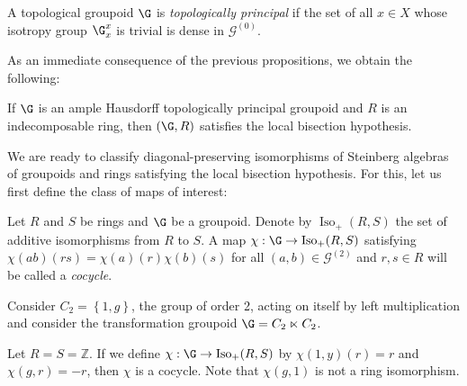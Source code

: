 \begin{definition}\label{definitiontopologicallyprincipal}
A topological groupoid $\G$ is \emph{topologically principal} if the set of all $x\in X$ whose isotropy group $\G_x^x$ is trivial is dense in $\mathcal{G}^{(0)}$.
\end{definition}

As an immediate consequence of the previous propositions, we obtain the following:

\begin{corollary}\label{corollarytopologicallyprincipalsatisfieslocalbisectionhypothesis}
If $\G$ is an ample Hausdorff topologically principal groupoid and $R$ is an indecomposable ring, then $(\G,R)$ satisfies the local bisection hypothesis.
\end{corollary}

We are ready to classify diagonal-preserving isomorphisms of Steinberg algebras of groupoids and rings satisfying the local bisection hypothesis. For this, let us first define the class of maps of interest:

\begin{definition}\label{definitioncocycle}
Let $R$ and $S$ be rings and $\G$ be a groupoid. Denote by $\operatorname{Iso}_+(R,S)$ the set of additive isomorphisms from $R$ to $S$. A map $\chi:\G\to\operatorname{Iso}_+(R,S)$ satisfying $\chi(ab)(rs)=\chi(a)(r)\chi(b)(s)$ for all $(a,b)\in\mathcal{G}^{(2)}$ and $r,s\in R$ will be called a \emph{cocycle}.
\end{definition}


\begin{example}
Consider $C_2=\left\{1,g\right\}$, the group of order 2, acting on itself by left multiplication and consider the transformation groupoid $\G=C_2\ltimes C_2$.

Let $R=S=\mathbb{Z}$. If we define $\chi:\G\to\operatorname{Iso}_+(R,S)$ by $\chi(1,y)(r)=r$ and $\chi(g,r)=-r$, then $\chi$ is a cocycle. Note that $\chi(g,1)$ is not a ring isomorphism.
\end{example}

